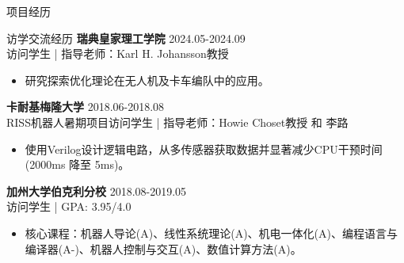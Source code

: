\documentclass{resume} %
\newcommand{\trianglebullet}{$\mbox{\ensuremath{\rhd}}$}
\begin{document}
\begin{rSection}{项目经历}
\end{rSection}

\newpage

\begin{rSection}{访学交流经历}
    \textbf{瑞典皇家理工学院}  \hfill {2024.05-2024.09}
    \\ 访问学生 | 指导老师：Karl H. Johansson教授
    \begin{itemize}
        \item 研究探索优化理论在无人机及卡车编队中的应用。
    \end{itemize}

    \textbf{卡耐基梅隆大学} \hfill {2018.06-2018.08} 
    \\ RISS机器人暑期项目访问学生 | 指导老师：Howie Choset教授 和 李路
    \begin{itemize}
        \item 使用Verilog设计逻辑电路，从多传感器获取数据并显著减少CPU干预时间 (2000ms 降至 5ms)。
    \end{itemize}
    \textbf{加州大学伯克利分校}  \hfill {2018.08-2019.05} 
    \\ 访问学生 | GPA: 3.95/4.0 
    \begin{itemize}
        \item 核心课程：机器人导论(A)、线性系统理论(A)、机电一体化(A)、编程语言与编译器(A-)、机器人控制与交互(A)、数值计算方法(A)。
    \end{itemize}
\end{rSection}
\end{document}
